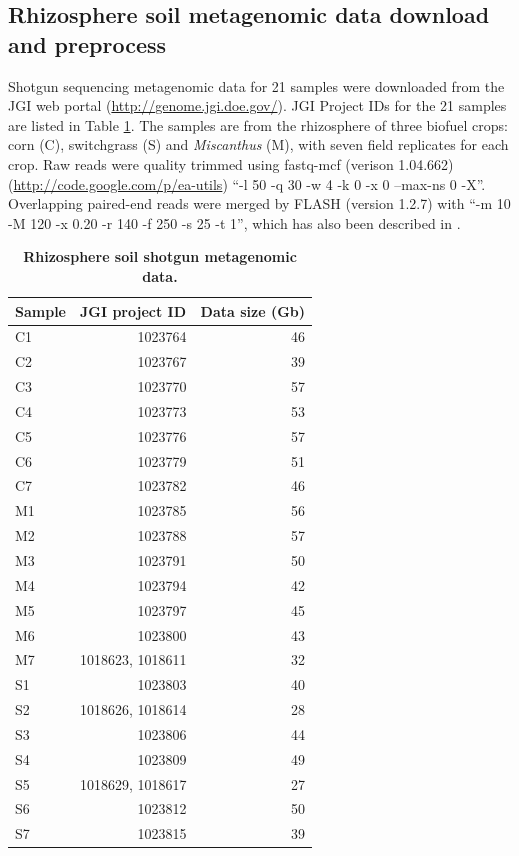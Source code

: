 \documentclass[]{msu-thesis}
\begin{document}
\subsection{Rhizosphere soil metagenomic data download and preprocess}
Shotgun sequencing metagenomic data for 21 samples were downloaded from the JGI web portal (\url{http://genome.jgi.doe.gov/}). JGI Project IDs for the 21 samples are listed in Table \ref{tab:S1}. The samples are from the rhizosphere of three biofuel crops: corn (C), switchgrass (S) and \textit{Miscanthus} (M), with seven field replicates for each crop. Raw reads were quality trimmed using fastq-mcf (verison 1.04.662) (\url{http://code.google.com/p/ea-utils}) ``-l 50 -q 30 -w 4 -k 0 -x 0 --max-ns 0 -X''. Overlapping paired-end reads were merged by FLASH (version 1.2.7) \cite{magoc_flash:_2011} with ``-m 10 -M 120 -x 0.20 -r 140 -f 250 -s 25 -t 1'', which has also been described in \cite{guo_microbial_2015}. 

\begin{table}[htbp]
  \centering
  \caption[Rhizosphere soil shotgun metagenomic data]{\textbf{Rhizosphere soil shotgun metagenomic data.} }
    \begin{tabular}{|lrr|}
    \toprule
    Sample & \multicolumn{1}{l}{JGI project ID} & \multicolumn{1}{l|}{Data size (Gb)} \\
    \midrule
    C1    & 1023764 & 46 \\
    C2    & 1023767 & 39 \\
    C3    & 1023770 & 57 \\
    C4    & 1023773 & 53 \\
    C5    & 1023776 & 57 \\
    C6    & 1023779 & 51 \\
    C7    & 1023782 & 46 \\
    M1    & 1023785 & 56 \\
    M2    & 1023788 & 57 \\
    M3    & 1023791 & 50 \\
    M4    & 1023794 & 42 \\
    M5    & 1023797 & 45 \\
    M6    & 1023800 & 43 \\
    M7    & \multicolumn{1}{l}{1018623, 1018611} & 32 \\
    S1    & 1023803 & 40 \\
    S2    & \multicolumn{1}{l}{1018626, 1018614} & 28 \\
    S3    & 1023806 & 44 \\
    S4    & 1023809 & 49 \\
    S5    & \multicolumn{1}{l}{1018629, 1018617} & 27 \\
    S6    & 1023812 & 50 \\
    S7    & 1023815 & 39 \\
    \bottomrule
    \end{tabular}%
  \label{tab:S1}%
\end{table}%
\end{document}
